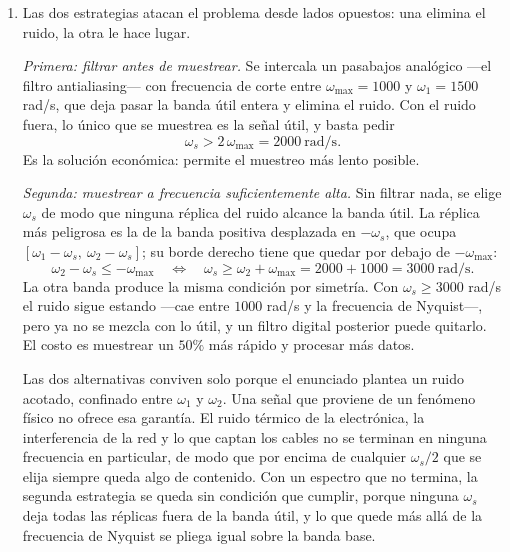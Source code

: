 \documentclass[10pt,a4paper]{article}
\begin{document}
\begin{enumerate}
		\emph{Si contaminan la banda útil.} La banda útil ocupa $|\omega| < 1000$ rad/s, y esas
		dos réplicas quedan enteramente adentro, superpuestas al flanco de la banda útil:
		\[
			\boxed{\;\text{sí, el ruido contamina la banda útil, sobre }
			500 < |\omega| < 1000 \ \text{rad/s}.\;}
		\]
		Sobre ese tramo la señal muestreada es la suma del flanco de la banda útil y la réplica
		del ruido, y una vez sumadas ocupan las mismas frecuencias.

		La señal útil, por sí sola, estaría bien muestreada, porque su velocidad de Nyquist es
		$2\omega_{\max} = 2000$ rad/s y $\omega_s = 2500$ la supera. Lo que rompe la condición
		es el ruido, que empuja la frecuencia máxima de $1000$ a $2000$ rad/s y con ella la
		velocidad de Nyquist de $2000$ a $4000$ rad/s.

		\item Las dos estrategias atacan el problema desde
		lados opuestos: una elimina el ruido, la otra le hace lugar.

		\emph{Primera: filtrar antes de muestrear.} Se intercala un pasabajos analógico
		---el filtro antialiasing--- con frecuencia de corte entre $\omega_{\max}=1000$ y
		$\omega_1=1500$ rad/s, que deja pasar la banda útil entera y elimina el ruido. Con el
		ruido fuera, lo único que se muestrea es la señal útil, y basta pedir
		\[
			\omega_s > 2\,\omega_{\max} = 2000 \ \text{rad/s}.
		\]
		Es la solución económica: permite el muestreo más lento posible.

		\emph{Segunda: muestrear a frecuencia suficientemente alta.} Sin filtrar nada, se elige $\omega_s$ de
		modo que ninguna réplica del ruido alcance la banda útil. La réplica más peligrosa es
		la de la banda positiva desplazada en $-\omega_s$, que ocupa
		$[\omega_1-\omega_s,\ \omega_2-\omega_s]$; su borde derecho tiene que quedar por debajo
		de $-\omega_{\max}$:
		\[
			\omega_2 - \omega_s \leq -\omega_{\max}
			\quad\Longleftrightarrow\quad
			\omega_s \geq \omega_2 + \omega_{\max} = 2000+1000 = 3000\ \text{rad/s}.
		\]
		La otra banda produce la misma condición por simetría. Con $\omega_s \geq 3000$ rad/s
		el ruido sigue estando ---cae entre $1000$ rad/s y la frecuencia de Nyquist---, pero ya
		no se mezcla con lo útil, y un filtro digital posterior puede quitarlo. El costo es
		muestrear un $50\%$ más rápido y procesar más datos.

		Las dos alternativas conviven solo porque el enunciado plantea un ruido acotado,
		confinado entre $\omega_1$ y $\omega_2$. Una señal que proviene de un
		fenómeno físico no ofrece esa garantía. El ruido térmico de la electrónica, la
		interferencia de la red y lo que captan los cables no se terminan en ninguna frecuencia
		en particular, de modo que por encima de cualquier $\omega_s/2$ que se elija siempre
		queda algo de contenido. Con un espectro que no termina, la segunda estrategia se queda
		sin condición que cumplir, porque ninguna $\omega_s$ deja todas las réplicas fuera de
		la banda útil, y lo que quede más allá de la frecuencia de Nyquist se pliega igual sobre
		la banda base.


\end{enumerate}
\end{document}
